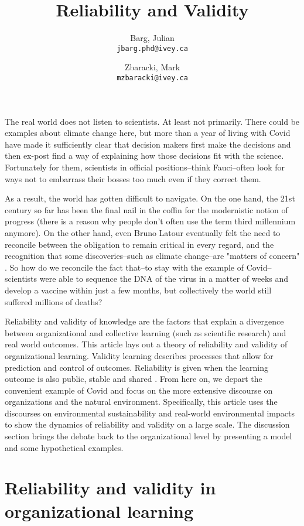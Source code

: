 \documentclass{article}
\title{Reliability and Validity}
\author{
	Barg, Julian\\
	\texttt{jbarg.phd@ivey.ca}
	\and
	Zbaracki, Mark\\
	\texttt{mzbaracki@ivey.ca}
}
\begin{document}
	\maketitle

	The real world does not listen to scientists. At least not primarily. There could be examples about climate change here, but more than a year of living with Covid have made it sufficiently clear that decision makers first make the decisions and then ex-post find a way of explaining how those decisions fit with the science. Fortunately for them, scientists in official positions--think Fauci--often look for ways not to embarrass their bosses too much even if they correct them.

	As a result, the world has gotten difficult to navigate. On the one hand, the 21st century so far has been the final nail in the coffin for the modernistic notion of progress (there is a reason why people don't often use the term third millennium anymore). On the other hand, even Bruno Latour eventually felt the need to reconcile between the obligation to remain critical in every regard, and the recognition that some discoveries--such as climate change--are "matters of concern" \citep{Latour2004}. So how do we reconcile the fact that--to stay with the example of Covid--scientists were able to sequence the DNA of the virus in a matter of weeks and develop a vaccine within just a few months, but collectively the world still suffered millions of deaths?

	Reliability and validity of knowledge are the factors that explain a divergence between organizational and collective learning (such as scientific research) and real world outcomes. This article lays out a theory of reliability and validity of organizational learning. Validity learning describes processes that allow for prediction and control of outcomes. Reliability is given when the learning outcome is also public, stable and shared \citep{March1991a}. From here on, we depart the convenient example of Covid and focus on the more extensive discourse on organizations and the natural environment. Specifically, this article uses the discourses on environmental sustainability and real-world environmental impacts to show the dynamics of reliability and validity on a large scale. The discussion section brings the debate back to the organizational level by presenting a model and some hypothetical examples.

	\section*{Reliability and validity in organizational learning}
\end{document}
